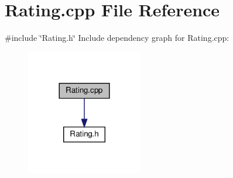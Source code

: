 \section{Rating.\+cpp File Reference}
\label{_rating_8cpp}
{\ttfamily \#include \char`\"{}Rating.\+h\char`\"{}}\newline
Include dependency graph for Rating.\+cpp\+:\nopagebreak
\begin{figure}[H]
\begin{center}
\leavevmode
\includegraphics[width=144pt]{_rating_8cpp__incl}
\end{center}
\end{figure}
